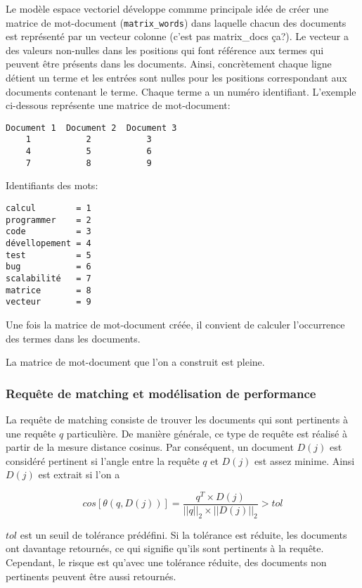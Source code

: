 Le modèle espace vectoriel développe commme principale idée
de créer une matrice de mot-document ({\tt matrix\_words})
dans laquelle chacun des documents est représenté par
un vecteur colonne {\color{red} (c'est pas matrix\_docs ça?)}.
Le vecteur a des valeurs non-nulles dans les positions qui font
référence aux termes qui peuvent être présents dans les documents.
Ainsi, concrètement chaque ligne détient un terme et les entrées
sont nulles pour les positions correspondant aux documents
contenant le terme.
Chaque terme a un numéro identifiant.
L'exemple ci-dessous représente une matrice de mot-document:

\begin{verbatim}
Document 1  Document 2  Document 3
    1           2           3
    4           5           6
    7           8           9
\end{verbatim}

Identifiants des mots:

\begin{verbatim}
calcul        = 1
programmer    = 2
code          = 3
dévellopement = 4
test          = 5
bug           = 6
scalabilité   = 7
matrice       = 8
vecteur       = 9
\end{verbatim}

Une fois la matrice de mot-document créée,
il convient de calculer l'occurrence des termes
dans les documents.

La matrice de mot-document que l'on a construit est pleine.

\subsubsection{Requête de matching et modélisation de performance}

La  requête de matching consiste de trouver les documents qui sont
pertinents à une requête $q$ particulière.
De manière générale, ce type de requête est réalisé à partir
de la mesure distance cosinus.
Par conséquent, un document $D(j)$ est considéré pertinent
si l'angle entre la requête $q$ et $D(j)$ est assez minime.
Ainsi $D(j)$ est extrait si l'on a

\[
	cos \left[ \theta(q, D(j)) \right]
	= \frac{q^T \times D(j)}
	       {\left|\left| q    \right|\right| _2 \times
	        \left|\left| D(j) \right|\right| _2} > tol
\]

$tol$ est un seuil de tolérance prédéfini.
Si la tolérance est réduite,
les documents ont davantage retournés,
ce qui signifie qu'ils sont pertinents à la requête.
Cependant, le risque est qu'avec une tolérance réduite,
des documents non pertinents peuvent être aussi retournés.

